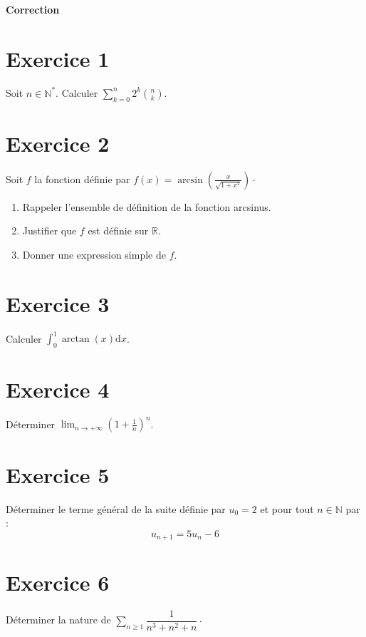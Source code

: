 \documentclass[a4paper,twoside,french,10pt]{VcCours}
\begin{document}

\begin{center}
\large\bf
Correction
\end{center}
\separationTitre


\section*{Exercice 1}
Soit $n \in \mathbb{N}^*$. Calculer $\sum_{k=0}^{n} 2^k \binom{n}{k}$.

\section*{Exercice 2}
Soit $f$ la fonction définie par $f(x) =  \arcsin \left( \frac{x}{\sqrt {1 + x^{2}}} \right) \cdot$

\begin{enumerate}
\item Rappeler l'ensemble de définition de la fonction arcsinus.
\item Justifier que $f$ est définie sur $\mathbb{R}$.
\item Donner une expression simple de $f$.
\end{enumerate}

\medskip
\section*{Exercice 3}
Calculer $\int_{0}^{1} \arctan(x) \text{d}x$.

\medskip
\section*{Exercice 4}
Déterminer $\lim_{n \rightarrow + \infty} \left( 1+ \frac{1}{n} \right)^n$.

\medskip
\section*{Exercice 5}
Déterminer le terme général de la suite définie par $u_0=2$ et pour tout $n \in \mathbb{N}$ par :
$$u_{n+1} = 5 u_n -6$$

\medskip
\section*{Exercice 6}
Déterminer la nature de $\sum_{n \geq 1} \dfrac{1}{n^3+n^2+n} \cdot$
\end{document}
